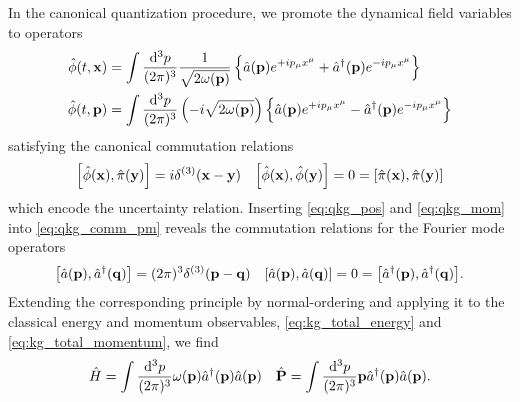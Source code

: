 In the canonical quantization procedure, we promote the dynamical field variables to operators
\begin{align}
	\hat\phi(t,\vb{x})
	&=
	\int\frac{\dd[3]{p}}{(2\pi)^3}
	\frac{1}{\sqrt{2\omega(\vb{p})}}
	\left\{
		\hat{a}(\vb{p})
		e^{+ip_\mu x^\mu}
		+
		\hat{a}^\dagger(\vb{p})
		e^{-ip_\mu x^\mu}
	\right\}
	\label{eq:qkg_pos}
	\\
	\hat\phi(t,\vb{p})
	&=
	\int\frac{\dd[3]{p}}{(2\pi)^3}
	\left(-i\sqrt{2\omega(\vb{p})}\right)
	\left\{
		\hat{a}(\vb{p})
		e^{+ip_\mu x^\mu}
		-
		\hat{a}^\dagger(\vb{p})
		e^{-ip_\mu x^\mu}
	\right\}
	\label{eq:qkg_mom}
\end{align}
satisfying the canonical commutation relations
\begin{align}
	\comm{\hat\phi(\vb{x})}{\hat\pi(\vb{y})}
	=
	i\delta^{(3)}(\vb{x}-\vb{y})
	&&
	\comm{\hat\phi(\vb{x})}{\hat\phi(\vb{y})}
	=
	0
	=
	\comm{\hat\pi(\vb{x})}{\hat\pi(\vb{y})}
	\label{eq:qkg_comm_pm}	
\end{align}
which encode the uncertainty relation.
Inserting \cref{eq:qkg_pos} and \cref{eq:qkg_mom} into \cref{eq:qkg_comm_pm} reveals the commutation relations for the Fourier mode operators
\begin{align}
	\comm{\hat{a}(\vb{p})}{\hat{a}^\dagger(\vb{q})}
	=
	(2\pi)^3\delta^{(3)}(\vb{p}-\vb{q})
	&&
	\comm{\hat{a}(\vb{p})}{\hat{a}(\vb{q})}
	=
	0
	=
	\comm{\hat{a}^\dagger(\vb{p})}{\hat{a}^\dagger(\vb{q})}
	\label{eq:kg_comm_ac}.
\end{align}
Extending the corresponding principle by normal-ordering and applying it to the classical energy and momentum observables, \cref{eq:kg_total_energy} and \cref{eq:kg_total_momentum}, we find
\begin{align}
	\hat{H}
	=
	\int\frac{\dd[3]{p}}{(2\pi)^3}
	\omega(\vb{p})\hat{a}^\dagger(\vb{p})\hat{a}(\vb{p})
	&&
	\hat{\vb{P}}
	=
	\int\frac{\dd[3]{p}}{(2\pi)^3}
	\vb{p}\hat{a}^\dagger(\vb{p})\hat{a}(\vb{p})
	\label{eq:qkg_total_energy_momentum}.
\end{align}

